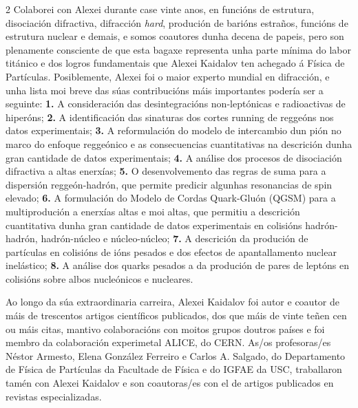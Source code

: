 \begin{multicols}{2}
Colaborei con Alexei durante case vinte anos, en funcións de estrutura,
disociación difractiva, difracción \textit{hard}, produción de barións
estraños, funcións de estrutura nuclear e demais, e somos coautores dunha
decena de papeis, pero son plenamente consciente de que esta bagaxe representa
unha parte mínima do labor titánico e dos logros fundamentais que Alexei
Kaidalov ten achegado á Física de Partículas. Posiblemente, Alexei foi o maior
experto mundial en difracción, e unha lista moi breve das súas contribucións
máis importantes podería ser a seguinte: \textbf{1.} A consideración das
desintegracións non-leptónicas e radioactivas de hiperóns; \textbf{2.} A
identificación das sinaturas dos cortes running de reggeóns nos datos
experimentais; \textbf{3.} A reformulación do modelo de intercambio dun pión no
marco do enfoque reggeónico e as consecuencias cuantitativas na descrición
dunha gran cantidade de datos experimentais; \textbf{4.} A análise dos procesos
de disociación difractiva a altas enerxías; \textbf{5.} O desenvolvemento das
regras de suma para a dispersión reggeón-hadrón, que permite predicir algunhas
resonancias de spin elevado; \textbf{6.} A formulación do Modelo de Cordas
Quark-Gluón (QGSM) para a multiprodución a enerxías altas e moi altas, que
permitiu a descrición cuantitativa dunha gran cantidade de datos experimentais
en colisións hadrón-hadrón, hadrón-núcleo e núcleo-núcleo; \textbf{7.} A
descrición da produción de partículas en colisións de ións pesados e dos
efectos de apantallamento nuclear inelástico; \textbf{8.} A análise dos quarks
pesados a da produción de pares de leptóns en colisións sobre albos nucleónicos
e nucleares.

Ao longo da súa extraordinaria carreira, Alexei Kaidalov foi autor e coautor de
máis de trescentos artigos científicos publicados, dos que máis de vinte teñen
cen ou máis citas, mantivo colaboracións con moitos grupos doutros países e foi
membro da colaboración experimetal ALICE, do CERN. As/os profesoras/es Néstor
Armesto, Elena González Ferreiro e Carlos A. Salgado, do Departamento de Física
de Partículas da Facultade de Física e do IGFAE da USC, traballaron tamén con
Alexei Kaidalov e son coautoras/es con el de artigos publicados en revistas
especializadas.


\end{multicols}
